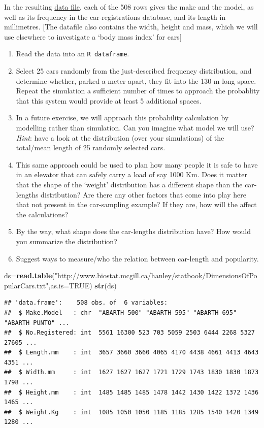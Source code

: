 \documentclass[]{book}
\newenvironment{Shaded}{\begin{snugshade}}{\end{snugshade}}
\newcommand{\DataTypeTok}[1]{\textcolor[rgb]{0.13,0.29,0.53}{#1}}
\newcommand{\KeywordTok}[1]{\textcolor[rgb]{0.13,0.29,0.53}{\textbf{#1}}}
\newcommand{\NormalTok}[1]{#1}
\newcommand{\OtherTok}[1]{\textcolor[rgb]{0.56,0.35,0.01}{#1}}
\newcommand{\StringTok}[1]{\textcolor[rgb]{0.31,0.60,0.02}{#1}}
\begin{document}
In the resulting \href{http://www.biostat.mcgill.ca/hanley/statbook/DimensionsOfPopularCars.txt}{data file}, each of the 508 rows
gives the make and the model, as well as its frequency in the car-registrations database, and its length in millimetres. {[}The datafile also contains the width, height and mass, which we will use elsewhere to investigate a `body mass index' for cars{]}

\begin{enumerate}
\def\labelenumi{\arabic{enumi}.}
\item
  Read the data into an \texttt{R\ dataframe}.
\item
  Select 25 cars randomly from the just-described frequency distribution, and determine whether, parked a meter apart, they fit into the 130-m long space. Repeat the simulation a sufficient number of times to approach the probablity that this system would provide at least 5 additional spaces.
\item
  In a future exercise, we will approach this probability calculation by modelling rather than simulation. Can you imagine what model we will use? \emph{Hint}: have a look at the distribution (over your simulations) of the total/mean length of 25 randomly selected cars.
\item
  This same approach could be used to plan how many people it is safe to have in an elevator that can safely carry a load of say 1000 Km. Does it matter that the shape of the `weight' distribution has a different shape than the car-lengths distribution? Are there any other factors that come into play here that not present in the car-sampling example? If they are, how will the affect the calculations?
\item
  By the way, what shape does the car-lengths distribution have?
  How would you summarize the distribution?
\item
  Suggest ways to measure/who the relation between car-length and popularity.
\end{enumerate}

\begin{Shaded}
\begin{Highlighting}[]
\NormalTok{ds=}\KeywordTok{read.table}\NormalTok{(}\StringTok{"http://www.biostat.mcgill.ca/hanley/statbook/DimensionsOfPopularCars.txt"}\NormalTok{,}\DataTypeTok{as.is=}\OtherTok{TRUE}\NormalTok{)}
\KeywordTok{str}\NormalTok{(ds)}
\end{Highlighting}
\end{Shaded}

\begin{verbatim}
## 'data.frame':    508 obs. of  6 variables:
##  $ Make.Model   : chr  "ABARTH 500" "ABARTH 595" "ABARTH 695" "ABARTH PUNTO" ...
##  $ No.Registered: int  5561 16300 523 703 5059 2503 6444 2268 5327 27605 ...
##  $ Length.mm    : int  3657 3660 3660 4065 4170 4438 4661 4413 4643 4351 ...
##  $ Width.mm     : int  1627 1627 1627 1721 1729 1743 1830 1830 1873 1798 ...
##  $ Height.mm    : int  1485 1485 1485 1478 1442 1430 1422 1372 1436 1465 ...
##  $ Weight.Kg    : int  1085 1050 1050 1185 1185 1285 1540 1420 1349 1280 ...
\end{verbatim}
\end{document}
